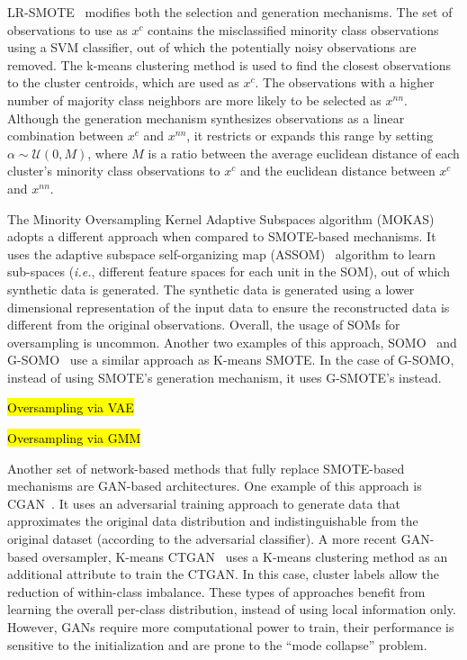 \documentclass[parskip=full]{scrartcl}
\begin{document}
LR-SMOTE~\cite{liang2020lr} modifies both the selection and generation
mechanisms. The set of observations to use as $x^c$ contains the misclassified
minority class observations using a SVM classifier, out of which the
potentially noisy observations are removed. The k-means clustering method is
used to find the closest observations to the cluster centroids, which are used
as $x^c$. The observations with a higher number of majority class neighbors
are more likely to be selected as $x^{nn}$. Although the generation mechanism
synthesizes observations as a linear combination between $x^c$ and $x^{nn}$,
it restricts or expands this range by setting $\alpha \sim \mathcal{U}(0, M)$,
where $M$ is a ratio between the average euclidean distance of each cluster's
minority class observations to $x^c$ and the euclidean distance between $x^c$
and $x^{nn}$.

The Minority Oversampling Kernel Adaptive Subspaces algorithm
(MOKAS)~\cite{lin2017minority} adopts a different approach when compared to
SMOTE-based mechanisms. It uses the adaptive subspace self-organizing map
(ASSOM)~\cite{kohonen1996emergence} algorithm to learn sub-spaces
(\textit{i.e.}, different feature spaces for each unit in the SOM), out of
which synthetic data is generated. The synthetic data is generated using a
lower dimensional representation of the input data to ensure the reconstructed
data is different from the original observations. Overall, the usage of SOMs
for oversampling is uncommon. Another two examples of this approach,
SOMO~\cite{douzas2017self} and G-SOMO~\cite{douzas2021g} use a similar
approach as K-means SMOTE\@. In the case of G-SOMO, instead of using SMOTE's
generation mechanism, it uses G-SMOTE's instead.

\hl{Oversampling via VAE}~\cite{dai2019generative}

\hl{Oversampling via GMM}~\cite{xing2022predict, xu2022synthetic}

Another set of network-based methods that fully replace SMOTE-based mechanisms
are GAN-based architectures. One example of this approach is
CGAN~\cite{douzas2018effective}. It uses an adversarial training approach to
generate data that approximates the original data distribution and
indistinguishable from the original dataset (according to the adversarial
classifier). A more recent GAN-based oversampler, K-means CTGAN~\cite{an2021k}
uses a K-means clustering method as an additional attribute to train the
CTGAN\@. In this case, cluster labels allow the reduction of within-class
imbalance. These types of approaches benefit from learning the overall
per-class distribution, instead of using local information only. However, GANs
require more computational power to train, their performance is sensitive to
the initialization and are prone to the ``mode collapse'' problem.
\end{document}
